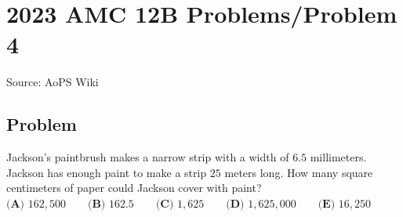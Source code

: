 \documentclass[12pt]{article}
\begin{document}
\section*{{2023 AMC 12B Problems/Problem 4}}
Source: AoPS Wiki

\subsection*{Problem}
Jackson's paintbrush makes a narrow strip with a width of $6.5$ millimeters. Jackson has enough paint to make a strip $25$ meters long. How many square centimeters of paper could Jackson cover with paint? $\textbf{(A) } 162,500 \qquad\textbf{(B) } 162.5 \qquad\textbf{(C) }1,625 \qquad\textbf{(D) }1,625,000 \qquad\textbf{(E) } 16,250$
\end{document}
